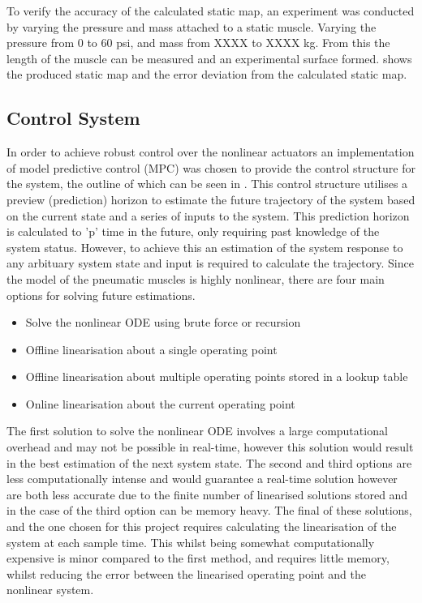 \documentclass[11pt,a4paper]{article}
\begin{document}
To verify the accuracy of the calculated static map, an experiment was conducted by varying the pressure and mass attached to a static muscle. Varying the pressure from 0 to 60 psi, and mass from XXXX to XXXX kg. From this the length of the muscle can be measured and an experimental surface formed.  shows the produced static map and  the error deviation from the calculated static map.

\subsection{Control System}
\label{sub:control_system}
In order to achieve robust control over the nonlinear actuators an implementation of model predictive control (MPC) was chosen to provide the control structure for the system, the outline of which can be seen in . This control structure utilises a preview (prediction) horizon to estimate the future trajectory of the system based on the current state and a series of inputs to the system. This prediction horizon is calculated to 'p' time in the future, only requiring past knowledge of the system status. However, to achieve this an estimation of the system response to any arbituary system state and input is required to calculate the trajectory. Since the model of the pneumatic muscles is highly nonlinear, there are four main options for solving future estimations.
\begin{itemize}
    \item Solve the nonlinear ODE using brute force or recursion
    \item Offline linearisation about a single operating point
    \item Offline linearisation about multiple operating points stored in a lookup table
    \item Online linearisation about the current operating point
\end{itemize}

The first solution to solve the nonlinear ODE involves a large computational overhead and may not be possible in real-time, however this solution would result in the best estimation of the next system state. The second and third options are less computationally intense and would guarantee a real-time solution however are both less accurate due to the finite number of linearised solutions stored and in the case of the third option can be memory heavy. The final of these solutions, and the one chosen for this project requires calculating the linearisation of the system at each sample time. This whilst being somewhat computationally expensive is minor compared to the first method, and requires little memory, whilst reducing the error between the linearised operating point and the nonlinear system.\newline
\end{document}
